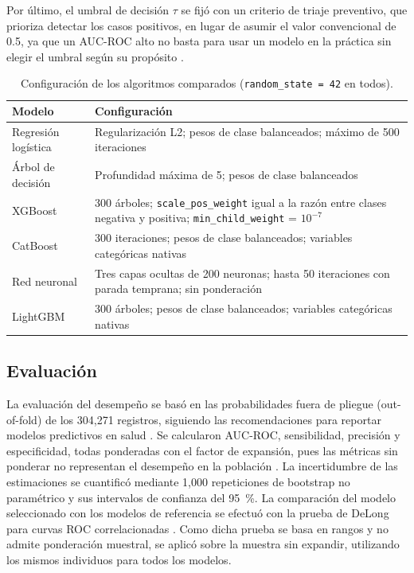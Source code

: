 \documentclass[final,5p,times,twocolumn,number,lefttitle]{elsarticle}
\begin{document}
Por último, el umbral de decisión $\tau$ se fijó con un criterio de triaje preventivo, que prioriza detectar los casos positivos, en lugar de asumir el valor convencional de 0.5, ya que un AUC-ROC alto no basta para usar un modelo en la práctica sin elegir el umbral según su propósito \citep{deng2025highauc}.

\begin{table}[!tp]
\centering
\caption{Configuración de los algoritmos comparados (\texttt{random\_state = 42} en todos).}
\label{tab:hiperparametros}
\small
\begin{tabular}{p{2.4cm}p{5.3cm}}
\hline
Modelo & Configuración \\
\hline
Regresión logística & Regularización L2; pesos de clase balanceados; máximo de 500 iteraciones \\
Árbol de decisión & Profundidad máxima de 5; pesos de clase balanceados \\
XGBoost & 300 árboles; \texttt{scale\_pos\_weight} igual a la razón entre clases negativa y positiva; \texttt{min\_child\_weight} = $10^{-7}$ \\
CatBoost & 300 iteraciones; pesos de clase balanceados; variables categóricas nativas \\
Red neuronal & Tres capas ocultas de 200 neuronas; hasta 50 iteraciones con parada temprana; sin ponderación \\
LightGBM & 300 árboles; pesos de clase balanceados; variables categóricas nativas \\
\hline
\end{tabular}
\end{table}

\subsection{Evaluación}

La evaluación del desempeño se basó en las probabilidades fuera de pliegue (out-of-fold) de los 304,271 registros, siguiendo las recomendaciones para reportar modelos predictivos en salud \citep{moons2015tripod}. Se calcularon AUC-ROC, sensibilidad, precisión y especificidad, todas ponderadas con el factor de expansión, pues las métricas sin ponderar no representan el desempeño en la población \citep{wadekar2024survey}. La incertidumbre de las estimaciones se cuantificó mediante 1,000 repeticiones de bootstrap no paramétrico \citep{efron1993bootstrap} y sus intervalos de confianza del 95~\%. La comparación del modelo seleccionado con los modelos de referencia se efectuó con la prueba de DeLong para curvas ROC correlacionadas \citep{delong1988roc}. Como dicha prueba se basa en rangos y no admite ponderación muestral, se aplicó sobre la muestra sin expandir, utilizando los mismos individuos para todos los modelos.
\end{document}
